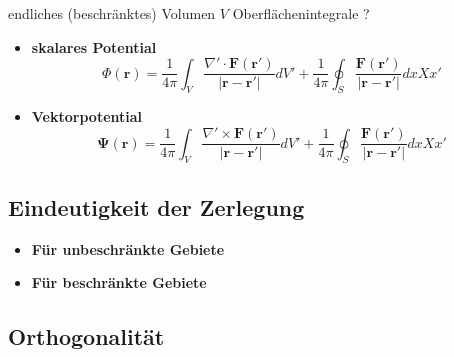 endliches (beschränktes) Volumen $V$ Oberflächenintegrale ?

\begin{itemize}
\item \textbf{skalares Potential}
\begin{equation}
\Phi (\mathbf{r}) = \frac{1}{4\pi} \int_V \frac{\nabla' \cdot \mathbf{F}(\mathbf{r}')}{|\mathbf{r} - \mathbf{r}'|} dV' + \frac{1}{4\pi} \oint_S \frac{\mathbf{F}(\mathbf{r}')}{|\mathbf{r} - \mathbf{r}'|} dxXx'
\end{equation}
\item \textbf{Vektorpotential}
\begin{equation}
\mathbf{\Psi}(\mathbf{r}) = \frac{1}{4\pi} \int_V \frac{\nabla' \times \mathbf{F}(\mathbf{r}')}{|\mathbf{r} - \mathbf{r}'|} dV' + \frac{1}{4\pi} \oint_S \frac{\mathbf{F}(\mathbf{r}')}{|\mathbf{r} - \mathbf{r}'|} dxXx'
\end{equation}
\end{itemize}


\subsection{Eindeutigkeit der Zerlegung 
\label{helmholtz:subsection:EindeutigkeitS}}

\begin{itemize}
\item \textbf{Für unbeschränkte Gebiete}
\item \textbf{Für beschränkte Gebiete}
\end{itemize}


\subsection{Orthogonalität
\label{helmholtz:subsection:Orthogonalitaet}}

